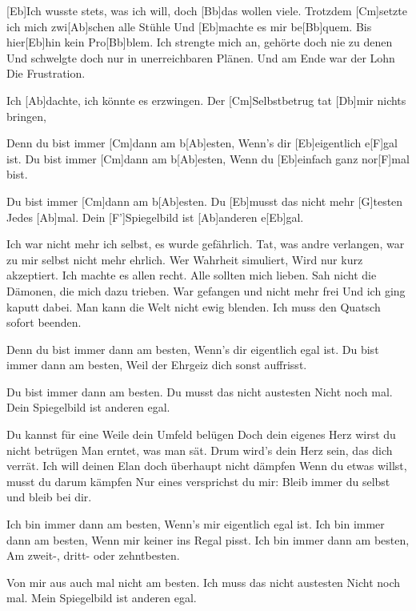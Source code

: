 

\begin{guitar}
	[Eb]Ich wusste stets, was ich will, doch [Bb]das wollen viele.
	Trotzdem [Cm]setzte ich mich zwi[Ab]schen alle Stühle
	Und [Eb]machte es mir be[Bb]quem.
	Bis hier[Eb]hin kein Pro[Bb]blem.
	Ich strengte mich an, gehörte doch nie zu denen
	Und schwelgte doch nur in unerreichbaren Plänen.
	Und am Ende war der Lohn
	Die Frustration.
	
	Ich [Ab]dachte, ich könnte es erzwingen.
	Der [Cm]Selbstbetrug tat [Db]mir nichts bringen,
	
	Denn du bist immer [Cm]dann am b[Ab]esten,
	Wenn's dir [Eb]eigentlich e[F]gal ist.
	Du bist immer [Cm]dann am b[Ab]esten,
	Wenn du [Eb]einfach ganz nor[F]mal bist.
	
	Du bist immer [Cm]dann am b[Ab]esten.
	Du [Eb]musst das nicht mehr [G]testen
	Jedes [Ab]mal.
	Dein [F']Spiegelbild ist [Ab]anderen e[Eb]gal.
	
	Ich war nicht mehr ich selbst, es wurde gefährlich.
	Tat, was andre verlangen, war zu mir selbst nicht mehr ehrlich.
	Wer Wahrheit simuliert,
	Wird nur kurz akzeptiert.
	Ich machte es allen recht. Alle sollten mich lieben.
	Sah nicht die Dämonen, die mich dazu trieben.
	War gefangen und nicht mehr frei
	Und ich ging kaputt dabei.
	\pagebreak
	Man kann die Welt nicht ewig blenden.
	Ich muss den Quatsch sofort beenden.
	
	Denn du bist immer dann am besten,
	Wenn's dir eigentlich egal ist.
	Du bist immer dann am besten,
	Weil der Ehrgeiz dich sonst auffrisst.

	Du bist immer dann am besten.
	Du musst das nicht austesten
	Nicht noch mal.
	Dein Spiegelbild ist anderen egal.
	
	Du kannst für eine Weile dein Umfeld belügen
	Doch dein eigenes Herz wirst du nicht betrügen
	Man erntet, was man sät. 
	Drum wird's dein Herz sein, das dich verrät.
	Ich will deinen Elan doch überhaupt nicht dämpfen
	Wenn du etwas willst, musst du darum kämpfen
	Nur eines versprichst du mir: 
	Bleib immer du selbst und bleib bei dir.
	
	Ich bin immer dann am besten,
	Wenn's mir eigentlich egal ist.
	Ich bin immer dann am besten,
	Wenn mir keiner ins Regal pisst.
	Ich bin immer dann am besten,
	Am zweit-, dritt- oder zehntbesten.
	
	Von mir aus auch mal nicht am besten.
	Ich muss das nicht austesten
	Nicht noch mal.
	Mein Spiegelbild ist anderen egal.
\end{guitar}